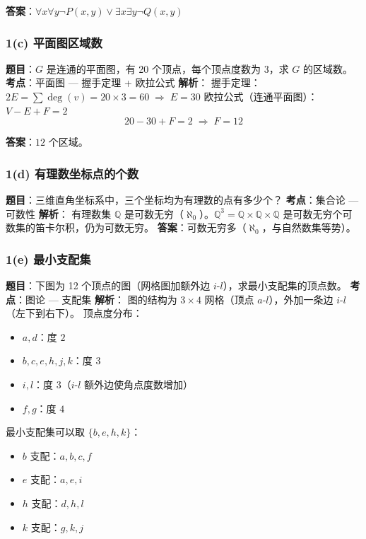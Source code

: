 \documentclass[10pt,a4paper,openany]{ctexbook}
\theoremstyle{definition}
\theoremstyle{remark}
\begin{document}
\textbf{答案}：$\boxed{\forall x \forall y \neg P(x, y) \lor \exists x \exists y \neg Q(x, y)}$
\vspace{-2pt}

\subsubsection{1(c) 平面图区域数}

\textbf{题目}：$G$ 是连通的平面图，有 20 个顶点，每个顶点度数为 3，求 $G$ 的区域数。
\textbf{考点}：平面图 — 握手定理 + 欧拉公式
\textbf{解析}：
握手定理：$2E = \sum \deg(v) = 20 \times 3 = 60 \;\Rightarrow\; E = 30$
欧拉公式（连通平面图）：$V - E + F = 2$
\[
 20 - 30 + F = 2 \;\Rightarrow\; F = 12 
\]

\textbf{答案}：$\boxed{12}$ 个区域。
\vspace{-2pt}

\subsubsection{1(d) 有理数坐标点的个数}

\textbf{题目}：三维直角坐标系中，三个坐标均为有理数的点有多少个？
\textbf{考点}：集合论 — 可数性
\textbf{解析}：
有理数集 $\mathbb{Q}$ 是可数无穷（$\aleph_0$）。$\mathbb{Q}^3 = \mathbb{Q} \times \mathbb{Q} \times \mathbb{Q}$ 是可数无穷个可数集的笛卡尔积，仍为可数无穷。
\textbf{答案}：$\boxed{\text{可数无穷多}}$（$\aleph_0$，与自然数集等势）。
\vspace{-2pt}

\subsubsection{1(e) 最小支配集}

\textbf{题目}：下图为 12 个顶点的图（网格图加额外边 $i$-$l$），求最小支配集的顶点数。
\textbf{考点}：图论 — 支配集
\textbf{解析}：
图的结构为 $3 \times 4$ 网格（顶点 $a$-$l$），外加一条边 $i$-$l$（左下到右下）。
顶点度分布：
\begin{itemize}
\item $a, d$：度 $2$
\item $b, c, e, h, j, k$：度 $3$
\item $i, l$：度 $3$（$i$-$l$ 额外边使角点度数增加）
\item $f, g$：度 $4$

\end{itemize}

最小支配集可以取 $\{b, e, h, k\}$：
\begin{itemize}
\item $b$ 支配：$a, b, c, f$
\item $e$ 支配：$a, e, i$
\item $h$ 支配：$d, h, l$
\item $k$ 支配：$g, k, j$

\end{itemize}
\end{document}
